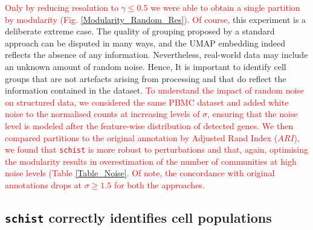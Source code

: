 \documentclass[10pt]{article}
\begin{document}
\textcolor{red}{Only by reducing resolution to $\gamma \leq 0.5$ we were able to obtain a single partition by modularity (Fig. \ref{Modularity_Random_Res}). Of course,} this experiment is a deliberate extreme case. The quality of grouping proposed by a standard approach can be disputed in many ways, and the UMAP embedding indeed reflects the absence of any information. Nevertheless, real-world data may include an unknown amount of random noise. Hence, It is important to identify cell groups that are not artefacts arising from processing and that do reflect the information contained in the dataset. \textcolor{red}{To understand the impact of random noise on structured data, we considered the same PBMC dataset and added white noise to the normalised counts at increasing levels of $\sigma$, ensuring that the noise level is modeled after the feature-wise distribution of detected genes. We then compared partitions to the original annotation by Adjusted Rand Index ($ARI$), we found that \texttt{schist} is more robust to perturbations and that, again, optimising the modularity results in overestimation of the number of communities at high noise levels (Table \ref{Table_Noise}. Of note, the concordance with original annotations drops at $\sigma \geq 1.5$ for both the approaches.}

\subsection*{\texttt{schist} correctly identifies cell populations}
\end{document}
